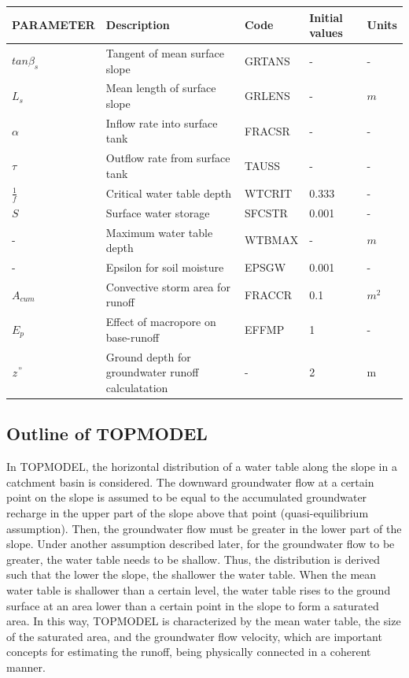 \begin{landscape}

\begin{longtable}[]{@{}lllll@{}}
\toprule\noalign{}
PARAMETER & Description & Code & Initial values & Units \\
\midrule\noalign{}
\endhead
\bottomrule\noalign{}
\endlastfoot
\(tan\beta_s\) & Tangent of mean surface slope & GRTANS & - & - \\
\(L_s\) & Mean length of surface slope & GRLENS & - & \(m\) \\
\(\alpha\) & Inflow rate into surface tank & FRACSR & - & - \\
\(\tau\) & Outflow rate from surface tank & TAUSS & - & - \\
\(\frac1f\) & Critical water table depth & WTCRIT & 0.333 & - \\
\(S\) & Surface water storage & SFCSTR & 0.001 & - \\
- & Maximum water table depth & WTBMAX & - & \(m\) \\
- & Epsilon for soil moisture & EPSGW & 0.001 & - \\
\(A_{cum}\) & Convective storm area for runoff & FRACCR & 0.1 & \(m^2\) \\
\(E_p\) & Effect of macropore on base-runoff & EFFMP & 1 & - \\
\(z^"\) & Ground depth for groundwater runoff calculatation & - & 2 & m \\
\end{longtable}

\end{landscape}

\subsection{Outline of TOPMODEL}\label{outline-of-topmodel}

In TOPMODEL, the horizontal distribution of a water table along the slope in a catchment basin is considered. The downward groundwater flow at a certain point on the slope is assumed to be equal to
the accumulated groundwater recharge in the upper part of the slope above that point (quasi-equilibrium assumption). Then, the groundwater flow must be greater in the lower part of the slope. Under
another assumption described later, for the groundwater flow to be greater, the water table needs to be shallow. Thus, the distribution is derived such that the lower the slope, the shallower the
water table. When the mean water table is shallower than a certain level, the water table rises to the ground surface at an area lower than a certain point in the slope to form a saturated area. In
this way, TOPMODEL is characterized by the mean water table, the size of the saturated area, and the groundwater flow velocity, which are important concepts for estimating the runoff, being physically
connected in a coherent manner.

